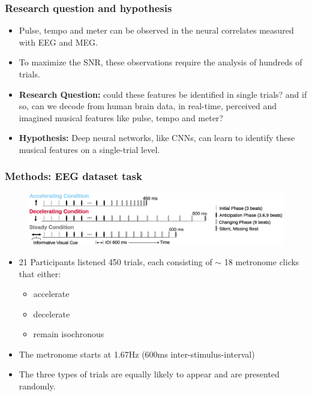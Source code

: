 \documentclass{beamer}
\begin{document}
\begin{frame}
	\frametitle{Research question and hypothesis}
	
	\begin{itemize}

		\item Pulse, tempo and meter can be observed in the neural correlates measured with EEG and MEG.

		\item To maximize the SNR, these observations require the analysis of hundreds of trials.

		\item \textbf{Research Question:} could these features be identified in single trials? and if so, can we decode from human brain data, in real-time, perceived and imagined musical features like pulse, tempo and meter? 
			 
		\item \textbf{Hypothesis:} Deep neural networks, like CNNs, can learn to identify these musical features on a single-trial level.

	\end{itemize}

\end{frame}

\begin{frame}
	\frametitle{Methods: EEG dataset task}
	
	\begin{figure}
		\centering
		\includegraphics[scale=0.7]{fig11.jpg}
	\end{figure}
	
	\begin{itemize}

		\item 21 Participants listened 450 trials, each consisting of $\mathtt{\sim}$ 18 metronome clicks that either:
		\begin{itemize} 
			\item accelerate
			\item decelerate
			\item remain isochronous
		\end{itemize}

		\item The metronome starts at 1.67Hz (600ms inter-stimulus-interval)

		\item The three types of trials are equally likely to appear and are presented randomly.

	\end{itemize}

\end{frame}
\end{document}
